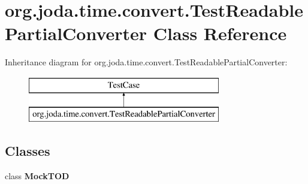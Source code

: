 \hypertarget{classorg_1_1joda_1_1time_1_1convert_1_1_test_readable_partial_converter}{\section{org.\-joda.\-time.\-convert.\-Test\-Readable\-Partial\-Converter Class Reference}
\label{classorg_1_1joda_1_1time_1_1convert_1_1_test_readable_partial_converter}
}
Inheritance diagram for org.\-joda.\-time.\-convert.\-Test\-Readable\-Partial\-Converter\-:\begin{figure}[H]
\begin{center}
\leavevmode
\includegraphics[height=2.000000cm]{classorg_1_1joda_1_1time_1_1convert_1_1_test_readable_partial_converter}
\end{center}
\end{figure}
\subsection*{Classes}
\begin{DoxyCompactItemize}
\item 
class {\bfseries Mock\-T\-O\-D}
\end{DoxyCompactItemize}
